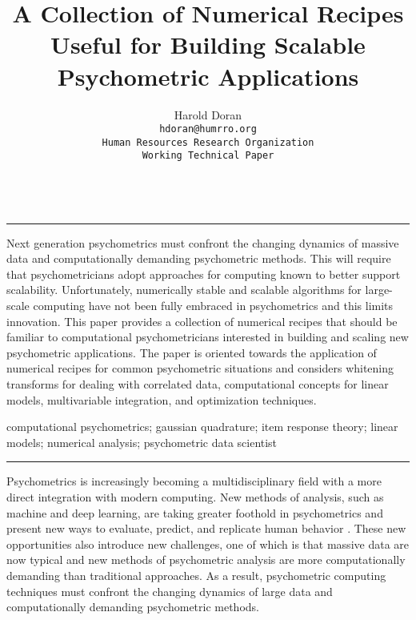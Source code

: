 \documentclass[12pt]{article}
\title{A Collection of Numerical Recipes Useful for Building Scalable Psychometric Applications}
\author{Harold Doran\\
	\texttt{hdoran@humrro.org}\\
	\texttt{Human Resources Research Organization}\\
	\texttt{Working Technical Paper}\\	\\
	}
\renewenvironment{abstract}
 {\quotation\small\noindent\rule{\linewidth}{.5pt}\par\smallskip
  {\centering\bfseries\abstractname\par}\medskip}
 {\par\noindent\rule{\linewidth}{.5pt}\endquotation}
\begin{document}
 
\maketitle

\begin{abstract}

Next generation psychometrics must confront the changing dynamics of massive data and computationally demanding psychometric methods. This will require that psychometricians adopt approaches for computing known to better support scalability. Unfortunately, numerically stable and scalable algorithms for large-scale computing have not been fully embraced in psychometrics and this limits innovation. This paper provides a collection of numerical recipes that should be familiar to computational psychometricians interested in building and scaling new psychometric applications. The paper is oriented towards the application of numerical recipes for common psychometric situations and considers whitening transforms for dealing with correlated data, computational concepts for linear models, multivariable integration, and optimization techniques.  
 
\vspace{0.2in}

 computational psychometrics; gaussian quadrature; item response theory; linear models; numerical analysis; psychometric data scientist

\end{abstract}

Psychometrics is increasingly becoming a multidisciplinary field with a more direct integration with modern computing. New methods of analysis, such as machine and deep learning, are taking greater foothold in psychometrics and present new ways to evaluate, predict, and replicate human behavior \cite{act}. These new opportunities also introduce new challenges, one of which is that massive data are now typical and new methods of psychometric analysis are more computationally demanding than traditional approaches. As a result, psychometric computing techniques must confront the changing dynamics of large data and computationally demanding psychometric methods. 
\end{document}
